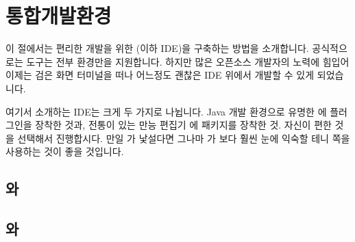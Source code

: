 \section{통합개발환경}\label{sec:ide}

이 절에서는 편리한 \OCAML{} 개발을 위한  (이하 IDE)을 구축하는 방법을
소개합니다. 공식적으로는 \OCAML{} 도구는 전부 
환경만을 지원합니다. 하지만 많은 오픈소스 개발자의 노력에 힘입어 이제는
검은 화면 터미널을 떠나 어느정도 괜찮은 IDE 위에서 개발할 수 있게 되었습니다.

여기서 소개하는 IDE는 크게 두 가지로 나뉩니다. \textsf{Java} 개발 환경으로
유명한 \ECLIPSE{}에 \OCAML{} 플러그인을 장착한 것과, 전통이 있는 만능 편집기
\EMACS{}에 \OCAML{} 패키지를 장착한 것. 자신이 편한 것을 선택해서
진행합시다. 만일 \EMACS{}가 낯설다면 그나마 \ECLIPSE{}가 \EMACS{} 보다 훨씬
눈에 익숙할 테니 \ECLIPSE{} 쪽을 사용하는 것이 좋을 것입니다.

\subsection{\ECLIPSE{}와 \OCAIDE{}}


\subsection{\EMACS{}와 \TYPEREX{}}




